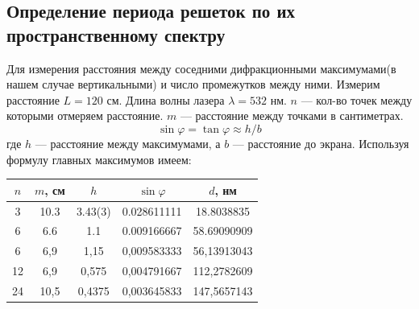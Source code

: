 \documentclass[a4paper, 12pt]{article}
\begin{document}
	\subsection{Определение периода решеток по их пространственному спектру}
	Для измерения расстояния между соседними дифракционными максимумами(в нашем случае вертикальными) и число промежутков между ними. Измерим расстояние $L=120$ см. Длина волны лазера $\lambda=532$ нм. $n$ — кол-во точек между которыми отмеряем расстояние. $m$ — расстояние между точками в сантиметрах.
	\begin{equation*}
		\sin\varphi=\tan\varphi\approx h/b
	\end{equation*}
	где $h$ — расстояние между максимумами, а $b$ — расстояние до экрана. Используя формулу главных максимумов имеем:
	\begin{table}[h]
	\centering
	\begin{tabular}{|c|c|c|c|c|}
  		\hline
  		$n$ & $m$, см & $h$ & $\sin\varphi$ & $d$, нм\\
  		\hline
  		3 & 10.3 & 3.43(3) & 0.028611111 & 18.8038835\\
  		6 & 6.6 & 1.1 & 0.009166667 & 58.69090909\\
  		6 & 6,9 & 1,15 & 0,009583333	 & 56,13913043\\
  		12 & 6,9 & 0,575 & 0,004791667 & 112,2782609\\
  		24 & 10,5 & 0,4375 & 0,003645833 & 147,5657143\\
  		\hline
	\end{tabular}
	\end{table}
\end{document}
